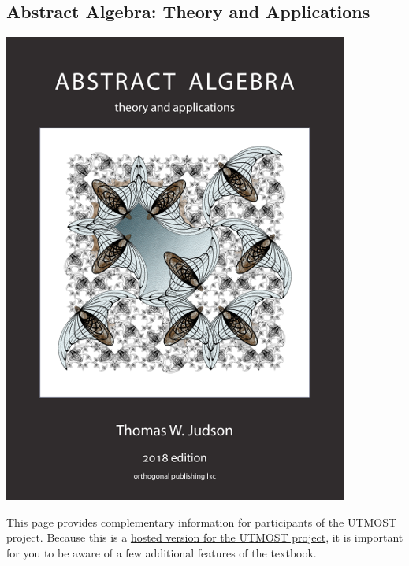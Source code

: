 \documentclass[10pt,]{article}
\begin{document}
\subsection[{Abstract Algebra: Theory and Applications}]{Abstract Algebra: Theory and Applications}\label{subsection-aata}
\leavevmode%
\begin{sidebyside}{2}{0.0125}{0.0125}{0.025}
\begin{sbspanel}{0.25}
\includegraphics[width=1\linewidth]{images/cover-aata.png}
\end{sbspanel}
\begin{sbspanel}{0.7}
\hypertarget{p-14}{}%
This page provides complementary information for participants of the UTMOST project. Because this is a \href{https://books.aimath.org/aata/index.html}{hosted version for the UTMOST project}, it is important for you to be aware of a few additional features of the textbook.%
\end{sbspanel}
\end{sidebyside}
\typeout{************************************************}
\typeout{************************************************}
\end{document}
